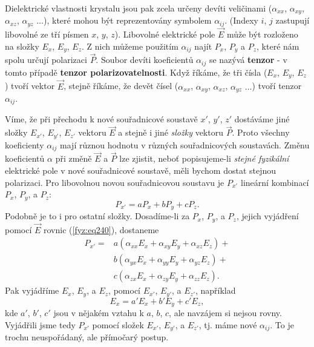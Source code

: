     Dielektrické vlastnosti krystalu jsou pak zcela určeny devíti veličinami (\(\alpha_{xx}\),
    \(\alpha_{xy}\), \(\alpha_{xz}\), \(\alpha_{yz}\) \(\ldots\)), které mohou být reprezentovány
    symbolem \(\alpha_{ij}\). (Indexy \(i\), \(j\) zastupují libovolné ze tří písmen \(x\), \(y\),
    \(z\)). Libovolné elektrické pole \(\vec{E}\) může být rozloženo na složky \(E_x\), \(E_y\),
    \(E_z\). Z nich můžeme použitím \(\alpha_{ij}\) najít \(P_x\), \(P_y\) a \(P_z\), které nám
    spolu určují polarizaci \(\vec{P}\). Soubor devíti koeficientů \(\alpha_{ij}\) se nazývá
    \textbf{tenzor} - v tomto případě \textbf{tenzor polarizovatelnosti}. Když říkáme, že tři čísla
    (\(E_x\), \(E_y\), \(E_z\)) tvoří vektor \(\vec{E}\), stejně říkáme, že devět čísel
    (\(\alpha_{xx}\), \(\alpha_{xy}\), \(\alpha_{xz}\), \(\alpha_{yz}\) \(\ldots\)) tvoří tenzor
    \(\alpha_{ij}\). 

    Víme, že při přechodu k nové souřadnicové soustavě \(x'\), \(y'\), \(z'\) dostáváme jiné složky
    \(E_{x'}\), \(E_{y'}\),  \(E_{z'}\) vektoru \(\vec{E}\) a stejně i jiné \emph{složky} vektoru
    \(\vec{P}\). Proto všechny koeficienty \(\alpha_{ij}\) mají různou hodnotu v různých
    souřadnicových soustavách. Změnu koeficientů \(\alpha\) při změně \(\vec{E}\) a \(\vec{P}\) lze
    zjistit, neboť popisujeme-li \emph{stejné fyzikální} elektrické pole v nové souřadnicové
    soustavě, měli bychom dostat stejnou polarizaci. Pro libovolnou novou souřadnicovou soustavu je
    \(P_{x'}\) lineární kombinací \(P_{x}\), \(P_{y}\), a \(P_{z}\):
    \begin{equation*}
      P_{x'} = aP_x + bP_y + cP_z.
    \end{equation*}
    Podobně je to i pro ostatní složky. Dosadíme-li za \(P_{x}\), \(P_{y}\), a \(P_{z}\), jejich
    vyjádření pomocí \(\vec{E}\) rovnic (\ref{fyz:eq240}), dostaneme
    \begin{align*}
      P_{x'} = &a(\alpha_{xx}E_x + \alpha_{xy}E_y + \alpha_{xz}E_z) + \\
               &b(\alpha_{yx}E_x + \alpha_{yy}E_y + \alpha_{yz}E_z) + \\
               &c(\alpha_{zx}E_x + \alpha_{zy}E_y + \alpha_{zz}E_z).
    \end{align*}
    Pak vyjádříme \(E_{x}\), \(E_{y}\), a \(E_{z}\), pomocí \(E_{x'}\), \(E_{y'}\), a \(E_{z'}\),
    například
    \begin{equation*}
      E_x =  a'E_x + b'E_y + c'E_z,
    \end{equation*}
    kde \(a'\), \(b'\), \(c'\) jsou v nějakém vztahu k \(a\), \(b\), \(c\), ale navzájem si nejsou
    rovny. Vyjádřili jsme tedy \(P_{x'}\) pomocí složek \(E_{x'}\), \(E_{y'}\), a \(E_{z'}\), tj.
    máme nové \(\alpha_{ij}\). To je trochu neuspořádaný, ale přímočarý postup.

